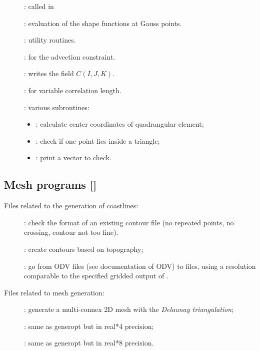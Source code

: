 \begin{description}
\item[]: called in 
\item[]: evaluation of the shape functions at Gauss points.
\item[]: utility routines.
\item[]: for the advection constraint.
\item[]: writes the field $C(I,J,K)$.  
\item[]: for variable correlation length.
\item[]: various subroutines: 
\begin{itemize}
\item[]  : calculate center coordinates of quadrangular element;
\item[]  : check if one point lies inside a triangle;
\item[]  : print a vector to check.
\end{itemize}

\end{description}


\subsection[Mesh programs]{Mesh programs []}

Files related to the generation of coastlines:
\begin{description}
\item[]: check the format of an existing contour file (no repeated points, no crossing, contour not too fine).
\item[]: create contours based on topography;
\item[]: go from ODV  files (see documentation of ODV) to \diva {} files, using a resolution comparable to the specified gridded output of .
\end{description}

Files related to mesh generation:
\begin{description}
\item[]: generate a multi-connex 2D mesh with the \textit{Delaunay tri\-angu\-la\-tion};
\item[]: same as generopt but in real*4 precision;
\item[]: same as generopt but in real*8 precision.
\end{description}


